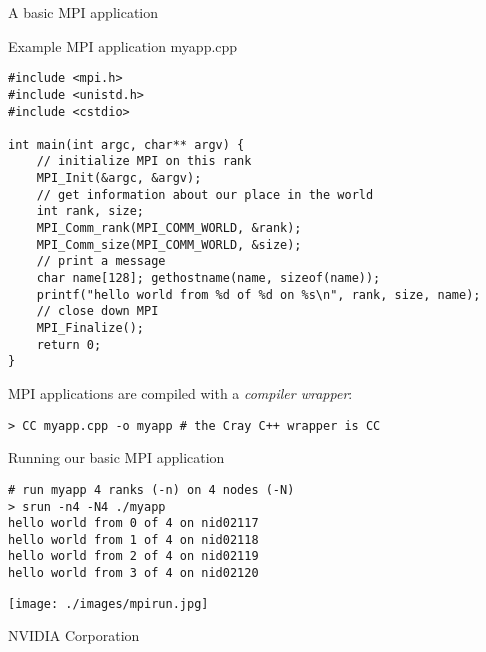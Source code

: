 \documentclass[aspectratio=43]{beamer}
\begin{document}
\begin{frame}[fragile]{A basic MPI application}
    \begin{code}{Example MPI application myapp.cpp}
        \begin{lstlisting}[style=boxcudatiny]
#include <mpi.h>
#include <unistd.h>
#include <cstdio>

int main(int argc, char** argv) {
    // initialize MPI on this rank
    MPI_Init(&argc, &argv);
    // get information about our place in the world
    int rank, size;
    MPI_Comm_rank(MPI_COMM_WORLD, &rank);
    MPI_Comm_size(MPI_COMM_WORLD, &size);
    // print a message
    char name[128]; gethostname(name, sizeof(name));
    printf("hello world from %d of %d on %s\n", rank, size, name);
    // close down MPI
    MPI_Finalize();
    return 0;
}
        \end{lstlisting}
    \end{code}

    MPI applications are compiled with a \emph{compiler wrapper}:
    \begin{terminal}{}
        \begin{lstlisting}[style=terminal]
> CC myapp.cpp -o myapp # the Cray C++ wrapper is CC
        \end{lstlisting}
    \end{terminal}
\end{frame}

\begin{frame}[fragile]{Running our basic MPI application}
    \begin{center}
        \begin{terminal}{}
            \begin{lstlisting}[style=terminal]
# run myapp 4 ranks (-n) on 4 nodes (-N)
> srun -n4 -N4 ./myapp
hello world from 0 of 4 on nid02117
hello world from 1 of 4 on nid02118
hello world from 2 of 4 on nid02119
hello world from 3 of 4 on nid02120
            \end{lstlisting}
        \end{terminal}

        \texttt{[image: ./images/mpirun.jpg]}
    \end{center}
    \footnotesize \quad\quad\quad\textcopyright NVIDIA Corporation
\end{frame}
\end{document}
